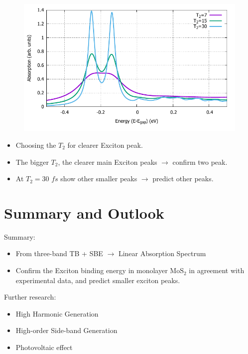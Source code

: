 \documentclass{beamer}
\begin{document}
\begin{frame}
		\begin{figure}
			\includegraphics[width=0.8\linewidth]{images/varyT2.pdf}
		\end{figure}
	
	\begin{itemize}
	\item Choosing the $T_2$ for clearer Exciton peak.
	\item The bigger $T_2$, the clearer main Exciton peaks $\to $ confirm two peak.
	\item At $T_2 = 30$ \(fs\) show other smaller peaks $\to $ predict other peaks.
	\end{itemize}
\end{frame}
	\section{Summary and Outlook}
	\begin{frame}
		Summary:
		\begin{itemize}
	\item From three-band TB + SBE $\to $ Linear Absorption Spectrum
	\item Confirm the Exciton binding energy in monolayer $\mathrm{MoS}_2$ in agreement with experimental data, and predict smaller exciton peaks.
		\end{itemize}
	Further research:
	\begin{itemize}
		\item High Harmonic Generation
		\item High-order Side-band Generation
		\item Photovoltaic effect
	\end{itemize}
	\end{frame}
\end{document}
